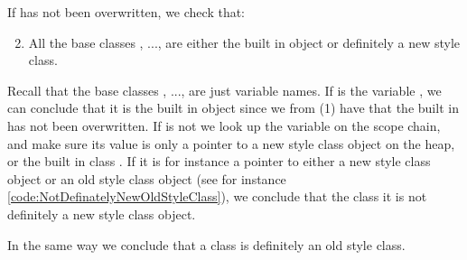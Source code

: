If  has not been overwritten, we check that:

\begin{enumerate}
\setcounter{enumi}{1}
	\item All the base classes , ...,  are either the built in object or definitely a new style class.
\end{enumerate}

Recall that the base classes , ...,  are just variable names. If  is the variable , we can conclude that it is the built in object since we from (1) have that the built in  has not been overwritten. If  is not  we look up the variable on the scope chain, and make sure its value is only a pointer to a new style class object on the heap, or the built in class . If it is for instance a pointer to either a new style class object or an old style class object (see for instance \autoref{code:NotDefinatelyNewOldStyleClass}), we conclude that the class  it is not definitely a new style class object.

In the same way we conclude that a class is definitely an old style class.
